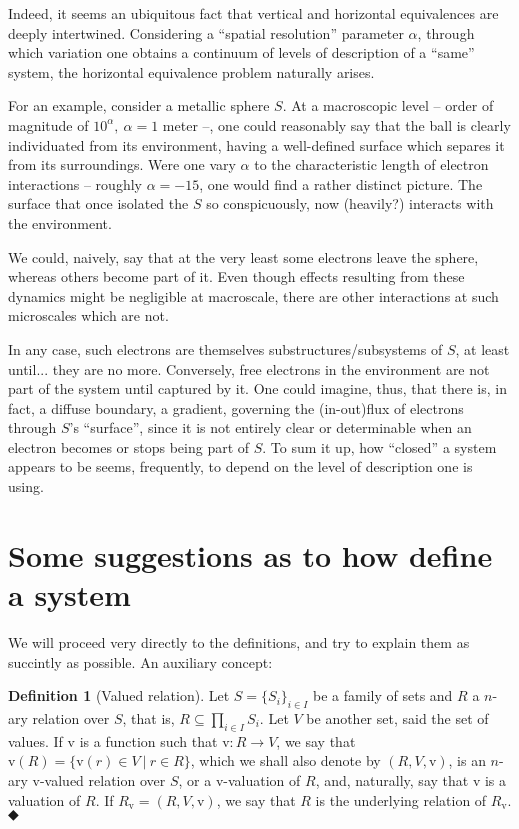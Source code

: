 \documentclass[12pt, a4paper]{article} %
\theoremstyle{definition}
\newtheorem{definition}{Definition}[section]
\begin{document}
	Indeed, it seems an ubiquitous fact that vertical and horizontal equivalences are deeply intertwined. Considering a ``spatial resolution'' parameter $\alpha$, through which variation one obtains a continuum of levels of description of a ``same'' system, the horizontal equivalence problem naturally arises. 
	
	For an example, consider a metallic sphere $S$. At a macroscopic level -- order of magnitude of $10^\alpha, \ \alpha = 1$ meter --, one could reasonably say that the ball is clearly individuated from its environment, having a well-defined surface which separes it from its surroundings. Were one vary $\alpha$ to the characteristic length of electron interactions -- roughly $\alpha = -15$, one would find a rather distinct picture. The surface that once isolated the $S$ so conspicuously, now (heavily?) interacts with the environment. 
	
	We could, naively, say that at the very least some electrons leave the sphere, whereas others become part of it. Even though effects resulting from these dynamics might be negligible at macroscale, there are other interactions at such microscales which are not.
	
	In any case, such electrons are themselves substructures/subsystems of $S$, at least until... they are no more. Conversely, free electrons in the environment are not part of the system until captured by it. One could imagine, thus, that there is, in fact, a diffuse boundary, a gradient, governing the (in-out)flux of electrons through $S$'s ``surface'', since it is not entirely clear or determinable when an electron becomes or stops being part of $S$. To sum it up, how ``closed'' a system appears to be seems, frequently, to depend on the level of description one is using.
	
	\section{Some suggestions as to how define a system}
	
	We will proceed very directly to the definitions, and try to explain them as succintly as possible. An auxiliary concept:
	
	\begin{definition}[Valued relation] Let $S = \{S_i\}_{i\in I}$ be a family of sets and $R$ a $n$-ary relation over $S$, that is, $R \subseteq \prod_{i \in I} S_i$. Let $V$ be another set, said the set of values. If $\mathrm{v}$ is a function such that $\mathrm{v}: R \rightarrow V$, we say that $\mathrm{v}(R) = \{\mathrm{v}(r) \in V\ |\ r \in R\}$, which we shall also denote by $(R, V, \mathrm{v})$, is an $n$-ary $\mathrm{v}$-valued relation over $S$, or a $\mathrm{v}$-valuation of $R$, and, naturally, say that $\mathrm{v}$ is a valuation of $R$. If $R_\mathrm{v} = (R, V, \mathrm{v})$, we say that $R$ is the underlying relation of $R_\mathrm{v}$. $\Diamondblack$
	\end{definition}
	\noindent
	
\end{document}
